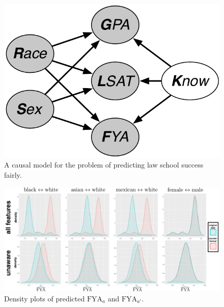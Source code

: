 \begin{figure}[th]
\begin{center}
\vspace{-1ex}
\centerline{\includegraphics[width=0.8\columnwidth]{law_school_model}}
\vspace{-2ex}
\caption{A causal model for the problem of predicting law school success fairly.\label{figure.law_school}}
\vspace{-2ex}
\end{center}
\end{figure}


\begin{figure}[th]
\begin{center}
 \label{figure.counterfactual}
\vspace{-1ex}
\centerline{\includegraphics[width=\columnwidth]{counterfactual}}
\vspace{-2ex}
\caption{Density plots of predicted $\mbox{FYA}_a$ and $\mbox{FYA}_{a'}$.}
\vspace{-2ex}
\end{center}
\end{figure}


